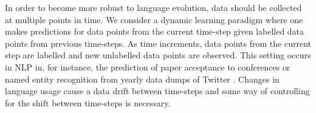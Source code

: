 \documentclass[letterpaper]{article} %
\begin{document}
In order to become more robust to language evolution, data should be collected at multiple points in time. We consider a dynamic learning paradigm where one makes predictions for data points from the current time-step given labelled data points from previous time-steps. As time increments, data points from the current step are labelled and new unlabelled data points are observed. This setting occurs in NLP in, for instance, the prediction of paper acceptance to conferences \cite{kang18naacl} or named entity recognition from yearly data dumps of Twitter \cite{derczynski:2016}. Changes in language usage cause a data drift between time-steps and some way of controlling for the shift between time-steps is necessary.

\end{document}
